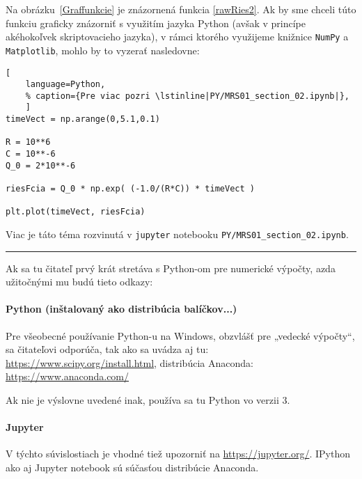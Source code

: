 \documentclass[a4paper, 10pt, ]{article}
\begin{document}
Na obrázku~\ref{Graffunkcie} je znázornená funkcia \eqref{rawRies2}. Ak by sme chceli túto funkciu graficky znázorniť s využitím jazyka Python (avšak v princípe akéhokoľvek skriptovacieho jazyka), v rámci ktorého využijeme knižnice \lstinline|NumPy| a \lstinline|Matplotlib|, mohlo by to vyzerať nasledovne:

\begin{lstlisting}[
    language=Python,
    % caption={Pre viac pozri \lstinline|PY/MRS01_section_02.ipynb|},
    ]
timeVect = np.arange(0,5.1,0.1)

R = 10**6
C = 10**-6
Q_0 = 2*10**-6

riesFcia = Q_0 * np.exp( (-1.0/(R*C)) * timeVect )

plt.plot(timeVect, riesFcia)
\end{lstlisting}
% 

\noindent
Viac je táto téma rozvinutá v \lstinline|jupyter| notebooku \lstinline|PY/MRS01_section_02.ipynb|.


\bigskip

\noindent
\hrule

\medskip

\noindent
Ak sa tu čitateľ prvý krát stretáva s Python-om pre numerické výpočty, azda užitočnými mu budú tieto odkazy:

\paragraph{Python (inštalovaný ako distribúcia balíčkov...)}
Pre všeobecné používanie Python-u na Windows, obzvlášť pre „vedecké výpočty“, sa čitateľovi odporúča, tak ako sa uvádza aj tu: \url{https://www.scipy.org/install.html}, distribúcia Anaconda: \url{https://www.anaconda.com/}


\medskip

\noindent
Ak nie je výslovne uvedené inak, používa sa tu Python vo verzii 3.

\paragraph{Jupyter}
V týchto súvislostiach je vhodné tiež upozorniť na \url{https://jupyter.org/}. IPython ako aj Jupyter notebook sú súčasťou distribúcie Anaconda.
\end{document}
